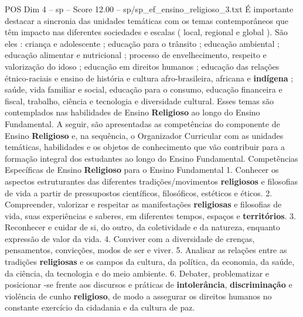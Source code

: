 \begin{textsample}{POS Dim 4 – sp – Score 12.00 – sp/sp\_ef\_ensino\_religioso\_3.txt}
É importante destacar a sincronia das unidades temáticas com os temas contemporâneos que têm impacto nas diferentes sociedades e escalas ( local, regional e global ).
São eles : criança e adolescente ; educação para o trânsito ; educação ambiental ; educação alimentar e nutricional ; processo de envelhecimento, respeito e valorização do idoso ; educação em direitos humanos ; educação das relações étnico-raciais e ensino de história e cultura afro-brasileira, africana e \textbf{indígena} ; saúde, vida familiar e social, educação para o consumo, educação financeira e fiscal, trabalho, ciência e tecnologia e diversidade cultural.
Esses temas são contemplados nas habilidades de Ensino \textbf{Religioso} ao longo do Ensino Fundamental.
A seguir, são apresentadas as competências do componente de Ensino \textbf{Religioso} e, na sequência, o Organizador Curricular com as unidades temáticas, habilidades e os objetos de conhecimento que vão contribuir para a formação integral dos estudantes ao longo do Ensino Fundamental.
Competências Específicas de Ensino \textbf{Religioso} para o Ensino Fundamental 1.
Conhecer os aspectos estruturantes das diferentes tradições/movimentos \textbf{religiosos} e filosofias de vida a partir de pressupostos científicos, filosóficos, estéticos e éticos. 2.
Compreender, valorizar e respeitar as manifestações \textbf{religiosas} e filosofias de vida, suas experiências e saberes, em diferentes tempos, espaços e \textbf{territórios}. 3.
Reconhecer e cuidar de si, do outro, da coletividade e da natureza, enquanto expressão de valor da vida. 4.
Conviver com a diversidade de crenças, pensamentos, convicções, modos de ser e viver. 5.
Analisar as relações entre as tradições \textbf{religiosas} e os campos da cultura, da política, da economia, da saúde, da ciência, da tecnologia e do meio ambiente. 6.
Debater, problematizar e posicionar -se frente aos discursos e práticas de \textbf{intolerância}, \textbf{discriminação} e violência de cunho \textbf{religioso}, de modo a assegurar os direitos humanos no constante exercício da cidadania e da cultura de paz.

\end{textsample}
